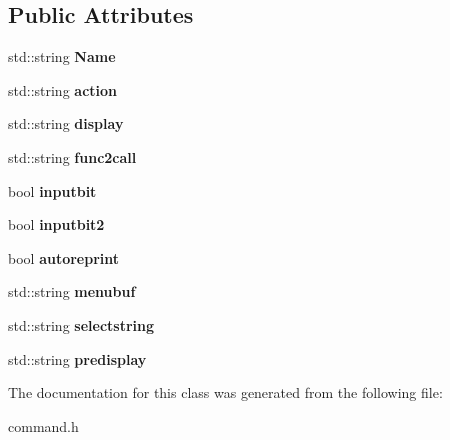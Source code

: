 \subsection*{Public Attributes}
\begin{DoxyCompactItemize}
\item 
std\+::string {\bfseries Name}\hypertarget{classmItem_aff3b2dc800c7d2298cd7036d8998aa7a}{}\label{classmItem_aff3b2dc800c7d2298cd7036d8998aa7a}

\item 
std\+::string {\bfseries action}\hypertarget{classmItem_ab6dd272435a8be4c0dd099f337f77c86}{}\label{classmItem_ab6dd272435a8be4c0dd099f337f77c86}

\item 
std\+::string {\bfseries display}\hypertarget{classmItem_a201251834601a0a47f1c20b6c1ba2db6}{}\label{classmItem_a201251834601a0a47f1c20b6c1ba2db6}

\item 
std\+::string {\bfseries func2call}\hypertarget{classmItem_ae3c2fdc3b8f7da54f40068152aa96b02}{}\label{classmItem_ae3c2fdc3b8f7da54f40068152aa96b02}

\item 
bool {\bfseries inputbit}\hypertarget{classmItem_a18e0d9ee40d6213d5bc2e829a8262582}{}\label{classmItem_a18e0d9ee40d6213d5bc2e829a8262582}

\item 
bool {\bfseries inputbit2}\hypertarget{classmItem_afd2b9fbebf2b2b6317239df3eb977be8}{}\label{classmItem_afd2b9fbebf2b2b6317239df3eb977be8}

\item 
bool {\bfseries autoreprint}\hypertarget{classmItem_aeaab0bc8932080de10eb8d36a44fe65f}{}\label{classmItem_aeaab0bc8932080de10eb8d36a44fe65f}

\item 
std\+::string {\bfseries menubuf}\hypertarget{classmItem_a9f0362bfcda6fd2ca3b7fbe705174de8}{}\label{classmItem_a9f0362bfcda6fd2ca3b7fbe705174de8}

\item 
std\+::string {\bfseries selectstring}\hypertarget{classmItem_ab1753997c29236c20f2d249e7a640608}{}\label{classmItem_ab1753997c29236c20f2d249e7a640608}

\item 
std\+::string {\bfseries predisplay}\hypertarget{classmItem_a1efc1845b2755f51d140ba7a31bfabf5}{}\label{classmItem_a1efc1845b2755f51d140ba7a31bfabf5}

\end{DoxyCompactItemize}


The documentation for this class was generated from the following file\+:\begin{DoxyCompactItemize}
\item 
command.\+h\end{DoxyCompactItemize}
